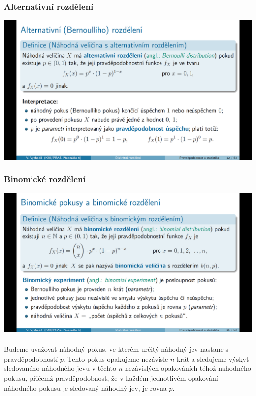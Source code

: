 \documentclass[12pt,a4paper]{article}
\begin{document}
\subsubsection{Alternativní rozdělení}
\begin{center}
	\includegraphics[scale=0.32]{img/diskretni_rozdeleni_alternativni}
\end{center}
\newpage
\subsubsection{Binomické rozdělení}
\begin{center}
	\includegraphics[scale=0.32]{img/diskretni_rozdeleni_binomicke}
\end{center}
\paragraph{} Budeme uvažovat náhodný pokus, ve kterém určitý náhodný jev nastane s pravděpodobností $p$. Tento pokus opakujeme nezávisle $n$-krát a sledujeme výskyt sledovaného náhodného jevu v těchto $n$ nezávislých opakováních téhož náhodného pokusu, přičemž pravděpodobnost, že v každém jednotlivém opakování náhodného pokusu je sledovaný náhodný jev, je rovna $p$.
\end{document}
